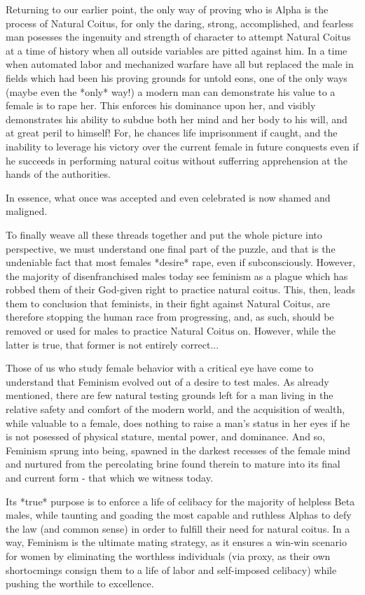 Returning to our earlier point, the only way of proving who is Alpha is the process of Natural Coitus, for only the 
daring, strong, accomplished, and fearless man posesses the ingenuity and strength of character to attempt Natural 
Coitus at a time of history when all outside variables are pitted against him. In a time when automated labor and 
mechanized warfare have all but replaced the male in fields which had been his proving grounds for untold eons, 
one of the only ways (maybe even the *only* way!) a modern man can demonstrate his value to a female is to rape her. 
This enforces his dominance upon her, and visibly demonstrates his ability to subdue both her mind and her body to 
his will, and at great peril to himself! For, he chances life imprisonment if caught, and the inability to leverage 
his victory over the current female in future conquests even if he succeeds in performing natural coitus without 
sufferring apprehension at the hands of the authorities.

In essence, what once was accepted and even celebrated is now shamed and maligned.

To finally weave all these threads together and put the whole picture into perspective, we must understand one 
final part of the puzzle, and that is the undeniable fact that most females *desire* rape, even if subconsciously. 
However, the majority of disenfranchised males today see feminism as a plague which has robbed them of their God-given
right to practice natural coitus. This, then, leads them to conclusion that feminists, in their fight against Natural 
Coitus, are therefore stopping the human race from progressing, and, as such, should be removed or used for males to 
practice Natural Coitus on. However, while the latter is true, that former is not entirely correct...

Those of us who study female behavior with a critical eye have come to understand that Feminism evolved out of a 
desire to test males. As already mentioned, there are few natural testing grounds left for a man living in the 
relative safety and comfort of the modern world, and the acquisition of wealth, while valuable to a female, does 
nothing to raise a man's status in her eyes if he is not posessed of physical stature, mental power, and dominance. 
And so, Feminism sprung into being, spawned in the darkest recesses of the female mind and nurtured from the 
percolating brine found therein to mature into its final and current form - that which we witness today.

Its *true* purpose is to enforce a life of celibacy for the majority of helpless Beta males, while taunting and 
goading the most capable and ruthless Alphas to defy the law (and common sense) in order to fulfill their need 
for natural coitus. In a way, Feminism is the ultimate mating strategy, as it ensures a win-win scenario for women 
by eliminating the worthless individuals (via proxy, as their own shortocmings consign them to a life of labor and 
self-imposed celibacy) while pushing the worthile to excellence.

